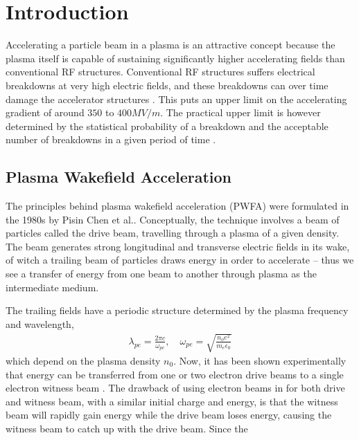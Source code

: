 %
%

\chapter{Introduction}
\label{Ch:Intro}

Accelerating a particle beam in a plasma is an attractive concept because the plasma itself is capable of sustaining
significantly higher accelerating fields than conventional RF structures. Conventional RF structures suffers electrical
breakdowns at very high electric fields, and these breakdowns can over time damage the accelerator structures
\cite{braun:2003}. This puts an upper limit on the accelerating gradient of around $350$ to $400\unit{MV/m}$. The
practical upper limit is however determined by the statistical probability of a breakdown and the acceptable number
of breakdowns in a given period of time \cite{pritzkau:2002}.

\section{Plasma Wakefield Acceleration}
\label{Int:PWFA}

The principles behind plasma wakefield acceleration (PWFA) were formulated in the 1980s by Pisin Chen et
al.\cite{chen:1985}. Conceptually, the technique involves a beam of particles called the drive beam, travelling through
a plasma of a given density. The beam generates strong longitudinal and transverse electric fields in its wake, of witch
a trailing beam of particles draws energy in order to accelerate -- thus we see a transfer of energy from one beam to
another through plasma as the intermediate medium.

The trailing fields have a periodic structure determined by the plasma frequency and wavelength,
\begin{align}
    \lambda_{pe} = \frac{2\pi c}{\omega_{pe}}, \quad
    \omega_{pe}  = \sqrt{\frac{n_{o}e^{2}}{m_{e}\epsilon_{0}}} \label{EQ:PWFA:L0W0}
\end{align}
which depend on the plasma density $n_{0}$.
Now, it has been shown experimentally that energy can be transferred from one or two electron drive beams to a single
electron witness beam \cite{rosenzweig:1988, blumenfeld:2007, kallos:2008}. The drawback of using electron beams in for
both drive and witness beam, with a similar initial charge and energy, is that the witness beam will rapidly gain energy
while the drive beam loses energy, causing the witness beam to catch up with the drive beam. Since the 

